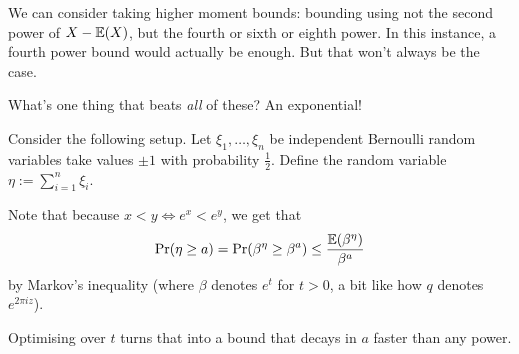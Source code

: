 We can consider taking higher moment bounds: bounding using not the second power of $X - \mathbb{E}(X)$, but the fourth or sixth or eighth power. In this instance, a fourth power bound would actually be enough. But that won't always be the case.

What's one thing that beats \textit{all} of these? An exponential!

Consider the following setup. Let $\xi_1, \ldots, \xi_n$ be independent Bernoulli random variables take values $\pm 1$ with probability $\frac{1}{2}$. Define the random variable $\eta := \sum_{i=1}^{n} \xi_i$.

Note that because $x < y \iff e^x < e^y$, we get that
\begin{align*}
    \Pr\!\left( \eta \geq a \right) = \Pr\!\left( \beta^{\eta} \geq \beta^a \right) \leq \frac{\mathbb{E}\!\left( \beta^{\eta} \right)}{\beta^a}
\end{align*}
by Markov's inequality (where $\beta$ denotes $e^t$ for $t > 0$, a bit like how $q$ denotes $e^{2 \pi i z}$).

Optimising over $t$ turns that into a bound that decays in $a$ faster than any power.

